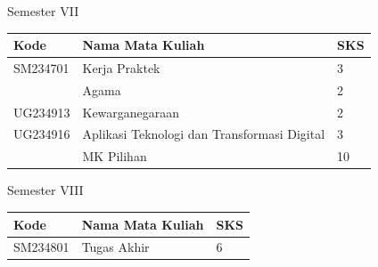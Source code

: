 \documentclass[aspectratio=169]{beamer} %
\begin{document}

\begin{frame}{Semester VII}

\begin{table}
	\renewcommand{\arraystretch}{1.3}
	\setlength{\tabcolsep}{10pt}
	\begin{tabular}{l l l}
		\toprule
		\textbf{Kode} & \textbf{Nama Mata Kuliah} & \textbf{SKS} \\
		\midrule
		SM234701 & Kerja Praktek & 3 \\
		& Agama & 2 \\
		UG234913 & Kewarganegaraan & 2 \\
		UG234916 & Aplikasi Teknologi dan Transformasi Digital & 3 \\
		& MK Pilihan & 10 \\
		\bottomrule
	\end{tabular}
\end{table}

\end{frame}


\begin{frame}{Semester VIII}

\begin{table}
	\renewcommand{\arraystretch}{1.3}
	\setlength{\tabcolsep}{10pt}
	\begin{tabular}{l l l}
		\toprule
		\textbf{Kode} & \textbf{Nama Mata Kuliah} & \textbf{SKS} \\
		\midrule
		SM234801 & Tugas Akhir & 6 \\
		\bottomrule
	\end{tabular}
\end{table}

\end{frame}

\end{document}

